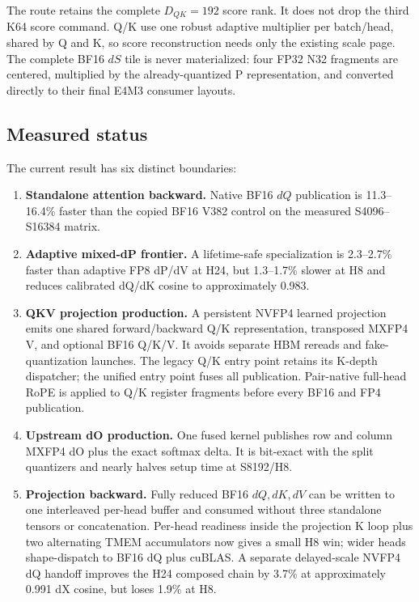 The route retains the complete $D_{QK}=192$ score rank.  It does not drop the
third K64 score command.  Q/K use one robust adaptive multiplier per
batch/head, shared by Q and K, so score reconstruction needs only the existing
scale page.  The complete BF16 $dS$ tile is never materialized: four FP32 N32
fragments are centered, multiplied by the already-quantized P representation,
and converted directly to their final E4M3 consumer layouts.

\subsection{Measured status}

The current result has six distinct boundaries:

\begin{enumerate}
  \item \textbf{Standalone attention backward.}  Native BF16 $dQ$ publication
  is 11.3--16.4\% faster than the copied BF16 V382 control on the measured
  S4096--S16384 matrix.
  \item \textbf{Adaptive mixed-dP frontier.}  A lifetime-safe specialization
  is 2.3--2.7\% faster than adaptive FP8 dP/dV at H24, but 1.3--1.7\% slower
  at H8 and reduces calibrated dQ/dK cosine to approximately 0.983.
  \item \textbf{QKV projection production.}  A persistent NVFP4 learned
  projection emits one shared forward/backward Q/K representation, transposed
  MXFP4 V, and optional BF16 Q/K/V.  It avoids separate HBM rereads and
  fake-quantization launches.  The legacy Q/K entry point retains its K-depth
  dispatcher; the unified entry point fuses all publication.  Pair-native
  full-head RoPE is applied to Q/K register fragments before every BF16 and
  FP4 publication.
  \item \textbf{Upstream dO production.}  One fused kernel publishes row and
  column MXFP4 dO plus the exact softmax delta.  It is bit-exact with the split
  quantizers and nearly halves setup time at S8192/H8.
  \item \textbf{Projection backward.}  Fully reduced BF16 $dQ,dK,dV$ can be
  written to one interleaved per-head buffer and consumed without three
  standalone tensors or concatenation.  Per-head readiness inside the
  projection K loop plus two alternating TMEM accumulators now gives a small
  H8 win; wider heads shape-dispatch to BF16 dQ plus cuBLAS.  A separate
  delayed-scale NVFP4 dQ handoff improves the H24 composed chain by 3.7\% at
  approximately 0.991 dX cosine, but loses 1.9\% at H8.

\end{enumerate}

